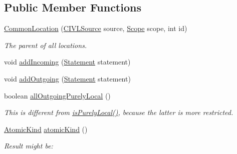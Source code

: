 \subsection*{Public Member Functions}
\begin{DoxyCompactItemize}
\item 
\hyperlink{classedu_1_1udel_1_1cis_1_1vsl_1_1civl_1_1model_1_1common_1_1location_1_1CommonLocation_a5f0727f4294dde0104b12978e1a584fc}{Common\+Location} (\hyperlink{interfaceedu_1_1udel_1_1cis_1_1vsl_1_1civl_1_1model_1_1IF_1_1CIVLSource}{C\+I\+V\+L\+Source} source, \hyperlink{interfaceedu_1_1udel_1_1cis_1_1vsl_1_1civl_1_1model_1_1IF_1_1Scope}{Scope} scope, int id)
\begin{DoxyCompactList}\small\item\em The parent of all locations. \end{DoxyCompactList}\item 
void \hyperlink{classedu_1_1udel_1_1cis_1_1vsl_1_1civl_1_1model_1_1common_1_1location_1_1CommonLocation_a0f0117e9def8e5cb6c057f7a77a56eca}{add\+Incoming} (\hyperlink{interfaceedu_1_1udel_1_1cis_1_1vsl_1_1civl_1_1model_1_1IF_1_1statement_1_1Statement}{Statement} statement)
\item 
void \hyperlink{classedu_1_1udel_1_1cis_1_1vsl_1_1civl_1_1model_1_1common_1_1location_1_1CommonLocation_a9a167f91e223a1b6129bd996ce5a57e1}{add\+Outgoing} (\hyperlink{interfaceedu_1_1udel_1_1cis_1_1vsl_1_1civl_1_1model_1_1IF_1_1statement_1_1Statement}{Statement} statement)
\item 
boolean \hyperlink{classedu_1_1udel_1_1cis_1_1vsl_1_1civl_1_1model_1_1common_1_1location_1_1CommonLocation_a558ad87e01f4ecd753d7c4af512b80f4}{all\+Outgoing\+Purely\+Local} ()
\begin{DoxyCompactList}\small\item\em This is different from \hyperlink{classedu_1_1udel_1_1cis_1_1vsl_1_1civl_1_1model_1_1common_1_1location_1_1CommonLocation_ad3c9de6f56680bf991aaec5149a860d6}{is\+Purely\+Local()}, because the latter is more restricted. \end{DoxyCompactList}\item 
\hyperlink{enumedu_1_1udel_1_1cis_1_1vsl_1_1civl_1_1model_1_1IF_1_1location_1_1Location_1_1AtomicKind}{Atomic\+Kind} \hyperlink{classedu_1_1udel_1_1cis_1_1vsl_1_1civl_1_1model_1_1common_1_1location_1_1CommonLocation_ab094cbf120db8395cfbcb24d45caafb6}{atomic\+Kind} ()
\begin{DoxyCompactList}\small\item\em Result might be\+: \end{DoxyCompactList}\item 

\end{DoxyCompactItemize}

